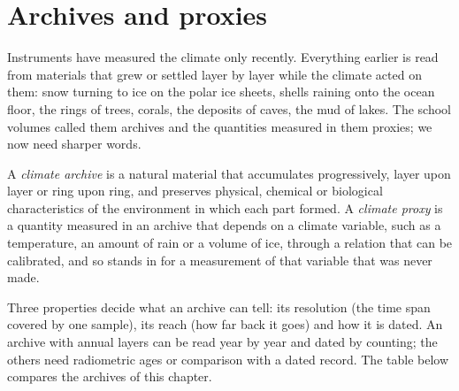 \section{Archives and proxies}\label{sec:b2:climate-proxies:archives}

Instruments have measured the climate only recently. Everything earlier is read from materials
that grew or settled layer by layer while the climate acted on them: snow turning to ice on the
polar ice sheets, shells raining onto the ocean floor, the rings of trees, corals, the deposits of
caves, the mud of lakes. The school volumes called them archives and the quantities measured in
them proxies; we now need sharper words.

\begin{definition}\label{def:b2:climate-proxies:proxy}
A \emph{climate archive} is a natural material that accumulates
progressively, layer upon layer or ring upon ring, and preserves physical, chemical or biological
characteristics of the environment in which each part formed. A \emph{climate
proxy} is a quantity measured in an archive that depends on a climate
variable, such as a temperature, an amount of rain or a volume of ice, through a relation that can
be calibrated, and so stands in for a measurement of that variable that was never made.
\end{definition}

Three properties decide what an archive can tell: its resolution (the time span covered by one
sample), its reach (how far back it goes) and how it is dated. An archive with annual layers can be
read year by year and dated by counting; the others need radiometric ages or comparison with a
dated record. The table below compares the archives of this chapter.

